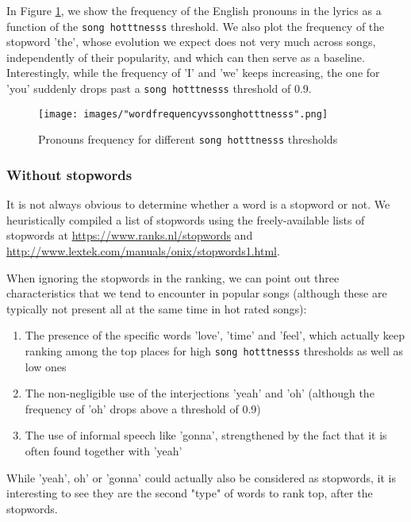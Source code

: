 \documentclass[11pt]{article}
\renewcommand\_{\textunderscore\allowbreak}
\begin{document}
In Figure \ref{fig:word_frequency_stopwords}, we show the frequency of the English pronouns in the lyrics as a function of the \texttt{song hotttnesss} threshold.
We also plot the frequency of the stopword 'the', whose evolution we expect does not very much across songs, independently of their popularity, and which can then serve as a baseline.
Interestingly, while the frequency of 'I' and 'we' keeps increasing, the one for 'you' suddenly drops past a \texttt{song hotttnesss} threshold of 0.9.


\begin{figure}[h!]
\centering
\captionsetup{width=1.0\textwidth}
\texttt{[image: images/"word\_frequency\_vs\_song\_hotttnesss".png]}
\caption{Pronouns frequency for different \texttt{song hotttnesss} thresholds}
\label{fig:word_frequency_stopwords}
\end{figure}

\subsubsection{Without stopwords}
It is not always obvious to determine whether a word is a stopword or not. We heuristically compiled a list of stopwords using the freely-available lists of stopwords at \url{https://www.ranks.nl/stopwords} and \url{http://www.lextek.com/manuals/onix/stopwords1.html}.

When ignoring the stopwords in the ranking, we can point out three characteristics that we tend to encounter in popular songs (although these are typically not present all at the same time in hot rated songs):
\begin{enumerate}
\itemsep 0mm
\item The presence of the specific words 'love', 'time' and 'feel', which actually keep ranking among the top places for high \texttt{song hotttnesss} thresholds as well as low ones
\item The non-negligible use of the interjections 'yeah' and 'oh' (although the frequency of 'oh' drops above a threshold of 0.9)
\item The use of informal speech like 'gonna', strengthened by the fact that it is often found together with 'yeah'
\end{enumerate}
While 'yeah', oh' or 'gonna' could actually also be considered as stopwords, it is interesting to see they are the second "type" of words to rank top, after the stopwords.
\end{document}
